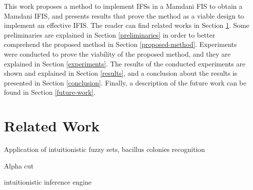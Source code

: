 \documentclass[conference]{IEEEtran}
\begin{document}
This work proposes a method to implement IFSs in a Mamdani FIS to
obtain a Mamdani IFIS, and presents results that prove the method as a
viable design to implement an effective IFIS. The reader can find
related works in Section \ref{related-work}. Some preliminaries are
explained in Section \ref{preliminaries} in order to better comprehend
the proposed method in Section \ref{proposed-method}. Experiments were
conducted to prove the viability of the proposed method, and they are
explained in Section \ref{experiments}. The results of the conducted
experiments are shown and explained in Section \ref{results}, and a
conclusion about the results is presented in Section
\ref{conclusion}. Finally, a description of the future work can be
found in Section \ref{future-work}.






\section{Related Work}
\label{related-work}

Application of intuitionistic fuzzy sets, bacillus colonies
recognition \cite{davarzani2013novel}

Alpha cut \cite{sharma2011cut} \cite{sharma2011cutgroups}

intuitionistic inference engine \cite{cornelis2001compositional} %
\end{document}
